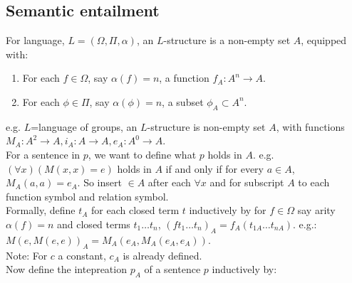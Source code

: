\subsection{Semantic entailment}
For language, $L=(\Omega, \Pi, \alpha)$, an $L$-structure is a non-empty set $A$, equipped with:
\begin{enumerate}
\item For each $f \in \Omega$, say $\alpha(f)=n$, a function $f_A: A^n \rightarrow A$.\\
\item For each $\phi \in \Pi$, say $\alpha(\phi)=n$, a subset $\phi_A \subset A^n$.
\end{enumerate}
e.g. $L$=language of groups, an $L$-structure is non-empty set $A$, with functions $M_A: A^2 \rightarrow A, i_A: A \rightarrow A, e_A: A^0 \rightarrow A$.\\
For a sentence in $p$, we want to define what $p$ holds in $A$.
e.g. $(\forall x)(M(x,x)=e)$ holds in $A$ if and only if for every $a \in A$, $M_A(a,a)=e_A$. So insert $\in A$ after each $\forall x$ and for subscript $A$ to each function symbol and relation symbol.\\
Formally, define $t_A$ for each closed term $t$ inductively by for $f \in \Omega$ say arity $\alpha(f)=n$ and closed terms $t_1 \ldots t_n$, $(ft_1 \ldots t_n)_A=f_A (t_{1A} \ldots t_{nA})$.
e.g.: $M(e,M(e,e))_A=M_A(e_A,M_A(e_A,e_A))$.\\
Note: For $c$ a constant, $c_A$ is already defined.\\
Now define the intepreation  $p_A$ of a sentence $p$ inductively by:\\
